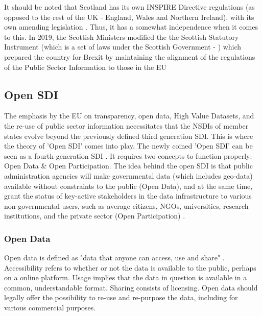 It should be noted that Scotland has its own INSPIRE Directive regulations (as opposed to the rest of the UK - England, Wales and Northern Ireland), with its own amending legislation \citep{Inspire_amendment_debate_2019}. Thus, it has a somewhat independence when it comes to this. In 2019, the Scottish Ministers modified the the Scottish Statutory Instrument (which is a set of laws under the Scottish Government - \citep{guide_SSIs}) which prepared the country for Brexit by maintaining the alignment of the regulations of the Public Sector Information to those in the EU \citep{Inspire_amendment_law_2019}

\subsection{Open SDI} %


The emphasis by the EU on transparency, open data, High Value Datasets, and the re-use of public sector information necessitates that the NSDIs of member states evolve beyond the previously defined third generation SDI. This is where the theory of 'Open SDI' comes into play. The newly coined 'Open SDI' can be seen as a fourth generation SDI \citep{geo1009_course}. It requires two concepts to function properly: Open Data \& Open Participation. The idea behind the open SDI is that public administration agencies will make governmental data (which includes geo-data) available without constraints to the public (Open Data), and at the same time, grant the status of key-active stakeholders in the data infrastructure to various non-governmental users, such as average citizens, NGOs, universities, research institutions, and the private sector (Open Participation) \citep{emergance_open_data_2018}.

\subsubsection{Open Data} 

Open data is defined as "data that anyone can access, use and share" \citep{euro_data_portal_open_data}. Accessibility refers to whether or not the data is available to the public, perhaps on a online platform. Usage implies that the data in question is available in a common, understandable format. Sharing consists of licensing. Open data should legally offer the possibility to re-use and re-purpose the data, including for various commercial purposes. 

